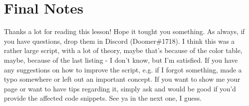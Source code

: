 \documentclass[a4paper,12pt]{article}
\begin{document}
\section{Final Notes}
Thanks a lot for reading this lesson! Hope it tought you something. As always, if you have questions, drop them in Discord (Doomer\#1718). I think this was a rather large script, with a lot of theory, maybe that's because of the color table, maybe, because of the last listing - I don't know, but I'm satisfied. If you have any suggestions on how to improve the script, e.g. if I forgot something, made a typo somewhere or left out an important concept. If you want to show me your page or want to have tips regarding it, simply ask and would be good if you'd provide the affected code snippets. See ya in the next one, I guess.
\end{document}
